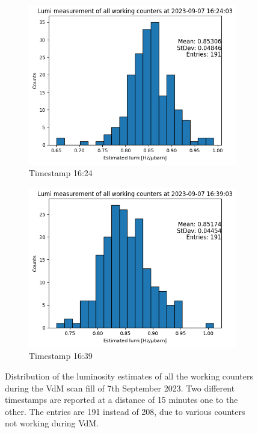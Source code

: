\begin{figure}
    \centering
    \begin{subfigure}{0.48\textwidth}
    \includegraphics[width=\linewidth]{figures/lumi_hist_1624.png}
    \caption{Timestamp 16:24}\label{fig:lumi1624}
    \end{subfigure}
    \begin{subfigure}{0.48\textwidth}
    \includegraphics[width=\linewidth]{figures/lumi_hist_1639.png}
    \caption{Timestamp 16:39}\label{fig:lumi1639}
    \end{subfigure}
    \caption{Distribution of the luminosity estimates of all the working counters during the VdM scan fill of 7th September 2023. Two different timestamps are reported at a distance of 15 minutes one to the other. The entries are 191 instead of 208, due to various counters not working during VdM.}
    \label{fig:lumi_hist_ts}
\end{figure}


